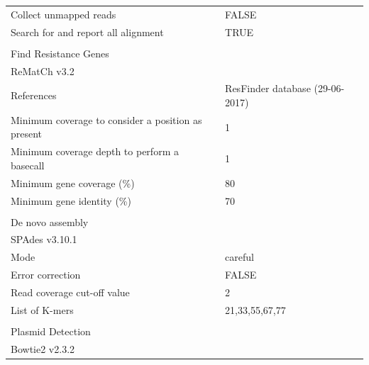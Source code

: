 \begin{table}[]
{\begin{tabular}{ll}
Collect unmapped reads                             & FALSE                              \\
Search for and report all alignment                & TRUE                               \\
                                                   &                                    \\
\multicolumn{2}{l}{Find Resistance Genes}                                               \\
ReMatCh v3.2                                       &                                    \\
References                                         & ResFinder database (29-06-2017)    \\
Minimum coverage to consider a position as present & 1                                  \\
Minimum coverage depth to perform a basecall       & 1                                  \\
Minimum gene coverage (\%)                         & 80                                 \\
Minimum gene identity (\%)                         & 70                                 \\
                                                   &                                    \\
\multicolumn{2}{l}{De novo assembly}                                                    \\
SPAdes v3.10.1                                     &                                    \\
Mode                                               & careful                            \\
Error correction                                   & FALSE                              \\
Read coverage cut-off value                        & 2                                  \\
List of K-mers                                     & 21,33,55,67,77                     \\
                                                   &                                    \\
\multicolumn{2}{l}{Plasmid Detection}                                                   \\
Bowtie2 v2.3.2                                     &                                    \\

\end{tabular}}
\end{table}
